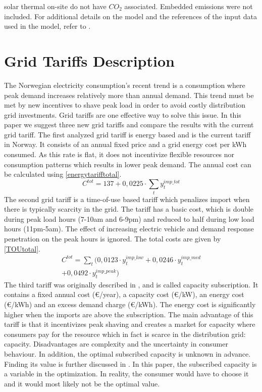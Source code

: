 \documentclass[conference]{IEEEtran}
\begin{document}
 solar thermal on-site do not have $CO_2$ associated. Embedded emissions were not included.
For additional details on the model and the references of the input data used in the model, refer to .
\section{Grid Tariffs Description}
The Norwegian electricity consumption's recent trend is a consumption where peak demand increases relatively more than annual demand. This trend must be met by new incentives to shave peak load in order to avoid costly distribution grid investments. Grid tariffs are one effective way to solve this issue. In this paper we suggest three new grid tariffs and compare the results with the current grid tariff.
The first analyzed grid tariff is energy based and is the current tariff in Norway. It consists of an annual fixed price and a grid energy cost per kWh consumed. As this rate is flat, it does not incentivize flexible resources nor consumption patterns which results in lower peak demand. The annual cost can be calculated using \eqref{energytarifftotal}.
\begin{equation}
    C^{tot} = 137 + 0,0225\cdot \sum_t y_{t}^{imp\_tot}
\end{equation}
The second grid tariff is a time-of-use based tariff which penalizes import when there is typically scarcity in the grid. The tariff has a basic cost, which is double during peak load hours (7-10am and 6-9pm) and reduced to half during low load hours (11pm-5am). The effect of increasing electric vehicle and demand response penetration on the peak hours is ignored. The total costs are given by \eqref{TOUtotal}.
\begin{multline}
    C^{tot} = \sum_t \big( 0,0123\cdot y_{t}^{imp\_low} + 0,0246\cdot y_{t}^{imp\_med} \\ 
    + 0,0492\cdot y_{t}^{imp\_peak} \big)
\end{multline}
The third tariff was originally described in , and is called capacity subscription. It contains a fixed annual cost (\euro/year), a capacity cost (\euro/kW), an energy cost (\euro/kWh) and an excess demand charge (\euro/kWh). The energy cost is significantly higher when the imports are above the subscription. The main advantage of this tariff is that it incentivizes peak shaving and creates a market for capacity where consumers pay for the resource which in fact is scarce in the distribution grid: capacity. Disadvantages are complexity and the uncertainty in consumer behaviour. In addition, the optimal subscribed capacity is unknown in advance. Finding its value is further discussed in . In this paper, the subscribed capacity is a variable in the optimization. In reality, the consumer would have to choose it and it would most likely not be the optimal value.
\end{document}
